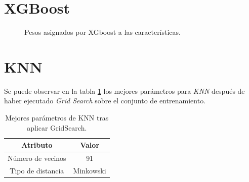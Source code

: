 \section{XGBoost}

  \begin{figure}[H]
      \centering
      
      \caption{Pesos asignados por XGboost a las características.}
      \label{FeatureWeightsImage}
   \end{figure}

\section{KNN}
  Se puede observar en la tabla \ref{BestParamsKNNGridSearchTable} los mejores parámetros para \textit{KNN} después de haber ejecutado \textit{Grid Search} sobre el conjunto de entrenamiento.\\

  \begin{table}[H]
      \centering
      \begin{tabular}{ |c|c| }
          \hline
          Atributo & Valor\\
          \hline
              Número de vecinos & 91 \\ 
              Tipo de distancia & Minkowski \\ 
          \hline
      \end{tabular}
      \caption{Mejores parámetros de KNN tras aplicar GridSearch.}
      \label{BestParamsKNNGridSearchTable}
  \end{table}


